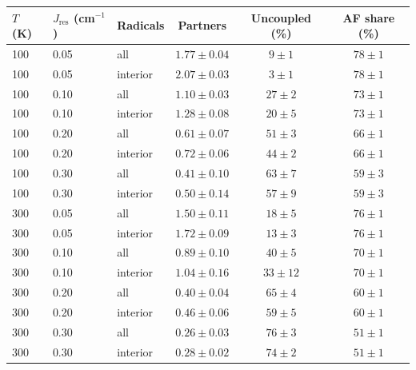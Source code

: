 \begin{tabular}{lllccc}
\toprule
$T$ (K) & $J_\mathrm{res}$ (cm$^{-1}$) & Radicals & Partners & Uncoupled (\%) & AF share (\%)\\
\midrule
100 & 0.05 & all & $1.77\pm0.04$ & $9\pm1$ & $78\pm1$\\
100 & 0.05 & interior & $2.07\pm0.03$ & $3\pm1$ & $78\pm1$\\
100 & 0.10 & all & $1.10\pm0.03$ & $27\pm2$ & $73\pm1$\\
100 & 0.10 & interior & $1.28\pm0.08$ & $20\pm5$ & $73\pm1$\\
100 & 0.20 & all & $0.61\pm0.07$ & $51\pm3$ & $66\pm1$\\
100 & 0.20 & interior & $0.72\pm0.06$ & $44\pm2$ & $66\pm1$\\
100 & 0.30 & all & $0.41\pm0.10$ & $63\pm7$ & $59\pm3$\\
100 & 0.30 & interior & $0.50\pm0.14$ & $57\pm9$ & $59\pm3$\\
300 & 0.05 & all & $1.50\pm0.11$ & $18\pm5$ & $76\pm1$\\
300 & 0.05 & interior & $1.72\pm0.09$ & $13\pm3$ & $76\pm1$\\
300 & 0.10 & all & $0.89\pm0.10$ & $40\pm5$ & $70\pm1$\\
300 & 0.10 & interior & $1.04\pm0.16$ & $33\pm12$ & $70\pm1$\\
300 & 0.20 & all & $0.40\pm0.04$ & $65\pm4$ & $60\pm1$\\
300 & 0.20 & interior & $0.46\pm0.06$ & $59\pm5$ & $60\pm1$\\
300 & 0.30 & all & $0.26\pm0.03$ & $76\pm3$ & $51\pm1$\\
300 & 0.30 & interior & $0.28\pm0.02$ & $74\pm2$ & $51\pm1$\\
\bottomrule
\end{tabular}
